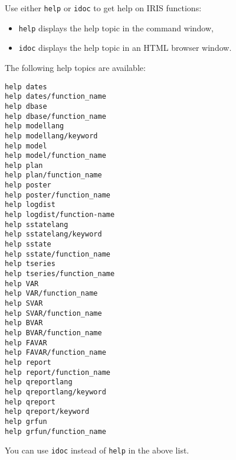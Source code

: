 

	Use either \texttt{help} or \texttt{idoc} to get help on IRIS functions:

\begin{itemize}
\itemsep1pt\parskip0pt
\item
  \texttt{help} displays the help topic in the command window,
\item
  \texttt{idoc} displays the help topic in an HTML browser window.
\end{itemize}

The following help topics are available:

\begin{verbatim}
help dates
help dates/function_name
help dbase
help dbase/function_name
help modellang
help modellang/keyword
help model
help model/function_name
help plan
help plan/function_name
help poster
help poster/function_name
help logdist
help logdist/function-name
help sstatelang
help sstatelang/keyword
help sstate
help sstate/function_name
help tseries
help tseries/function_name
help VAR
help VAR/function_name
help SVAR
help SVAR/function_name
help BVAR
help BVAR/function_name
help FAVAR
help FAVAR/function_name
help report
help report/function_name
help qreportlang
help qreportlang/keyword
help qreport
help qreport/keyword
help grfun
help grfun/function_name
\end{verbatim}

You can use \texttt{idoc} instead of \texttt{help} in the above list.



